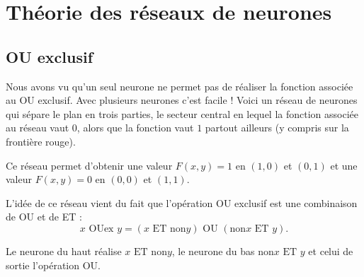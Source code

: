 \documentclass[11pt,class=report,crop=false]{standalone}
\begin{document}

\section{Théorie des réseaux de neurones}

\subsection{OU exclusif}

Nous avons vu qu'un seul neurone ne permet pas de réaliser la fonction associée au \og{}OU exclusif\fg{}.
Avec plusieurs neurones c'est facile !
Voici un réseau de neurones qui sépare le plan en trois parties, le secteur central en lequel la fonction associée au réseau vaut $0$, alors que la fonction vaut $1$ partout ailleurs (y compris sur la frontière rouge).




Ce réseau permet d'obtenir une valeur $F(x,y)=1$ en $(1,0)$ et $(0,1)$ et une valeur $F(x,y)=0$ en $(0,0)$ et $(1,1)$.

L'idée de ce réseau vient du fait que l'opération \og{}OU exclusif\fg{} est une combinaison de \og{}OU\fg{} et de \og{}ET\fg{} :
$$x \text{ OUex } y  = (x \text{ ET } \text{non} y) \text{ OU } ( \text{non} x \text{ ET } y).$$


\begin{center}
\begin{minipage}{0.60\textwidth}
\end{minipage}
\begin{minipage}{0.39\textwidth}
\end{minipage}
\end{center}

Le neurone du haut réalise \og{}$x \text{ ET } \text{non} y$\fg{}, le neurone du bas \og{}$\text{non} x \text{ ET } y$\fg{} et celui de sortie l'opération \og{}OU\fg{}.

\end{document}
